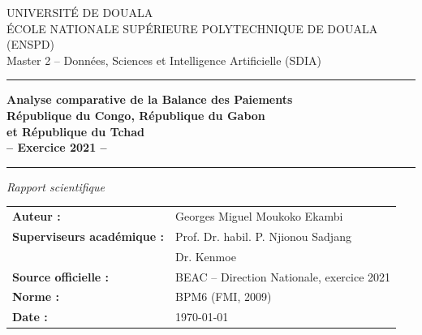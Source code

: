 \documentclass[12pt,a4paper]{article}
\begin{document}
\begin{titlepage}
  \centering
  {\small UNIVERSITÉ DE DOUALA\\
  ÉCOLE NATIONALE SUPÉRIEURE POLYTECHNIQUE DE DOUALA (ENSPD)\\
  Master 2 -- Données, Sciences et Intelligence Artificielle (SDIA)}

  \vspace{1cm}
  \rule{\linewidth}{0.5pt}
  \vspace{0.5cm}

  {\LARGE\bfseries\color{congoblue}
    Analyse comparative de la Balance des Paiements\\[0.4cm]
    République du Congo, République du Gabon\\
    et République du Tchad\\[0.3cm]
    -- Exercice 2021 --}

  \vspace{0.5cm}
  \rule{\linewidth}{0.5pt}

  \vspace{1.2cm}
  {\large\itshape Rapport scientifique}

  \vfill

  \begin{tabular}{ll}
    \textbf{Auteur :}        & Georges Miguel Moukoko Ekambi \\[4pt]
    \textbf{Superviseurs académique :}  & Prof. Dr. habil. P. Njionou Sadjang \\
                             & Dr. Kenmoe \\[4pt]
    \textbf{Source officielle :} & BEAC -- Direction Nationale, exercice 2021 \\[4pt]
    \textbf{Norme :}         & BPM6 (FMI, 2009) \\[4pt]
    \textbf{Date :}          & \today
  \end{tabular}

  \vspace{1cm}
\end{titlepage}
\end{document}

